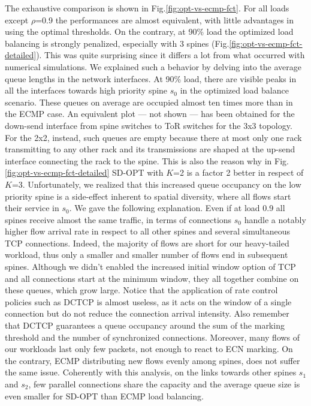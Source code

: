 The exhaustive comparison is shown in Fig.\ref{fig:opt-vs-ecmp-fct}. For all loads except $\rho$=0.9 the performances are almost equivalent, with little advantages in using the optimal thresholds. On the contrary, at 90\% load the optimized load balancing is strongly penalized, especially with 3 spines (Fig.\ref{fig:opt-vs-ecmp-fct-detailed}). This was quite surprising since it differs a lot from what occurred with numerical simulations. We explained such a behavior by delving into the average queue lengths in the network interfaces. At 90\% load, there are visible peaks in all the interfaces towards high priority spine $s_0$ in the optimized load balance scenario. These queues on average are occupied almost ten times more than in the ECMP case. An equivalent plot --- not shown --- has been obtained for the down-send interface from spine switches to ToR switches for the 3x3 topology. For the 2x2, instead, such queues are empty because there at most only one rack transmitting to any other rack and its transmissions are shaped at the up-send interface connecting the rack to the spine. This is also the reason why in Fig. \ref{fig:opt-vs-ecmp-fct-detailed} SD-OPT with $K$=2 is a factor 2 better in respect of $K$=3. Unfortunately, we realized that this increased queue occupancy on the low priority spine is a side-effect inherent to spatial diversity, where all flows start their service in $s_0$. We gave the following explanation. Even if at load 0.9 all spines receive almost the same traffic, in terms of connections $s_0$ handle a notably higher flow arrival rate in respect to all other spines and several simultaneous TCP connections. Indeed, the majority of flows are short for our heavy-tailed workload, thus only a smaller and smaller number of flows end in subsequent spines. Although we didn't enabled the increased initial window option of TCP and all connections start at the minimum window, they all together combine on these queues, which grow large. Notice that the application of rate control policies such as DCTCP is almost useless, as it acts on the window of a single connection but do not reduce the connection arrival intensity. Also remember that DCTCP guarantees a queue occupancy around the sum of the marking threshold and the number of synchronized connections. Moreover, many flows of our workloads last only few packets, not enough to react to ECN marking. On the contrary, ECMP distributing new flows evenly among spines, does not suffer the same issue. Coherently with this analysis, on the links towards other spines $s_1$ and $s_2$, few parallel connections share the capacity and the average queue size is even smaller for SD-OPT than ECMP load balancing. \\
